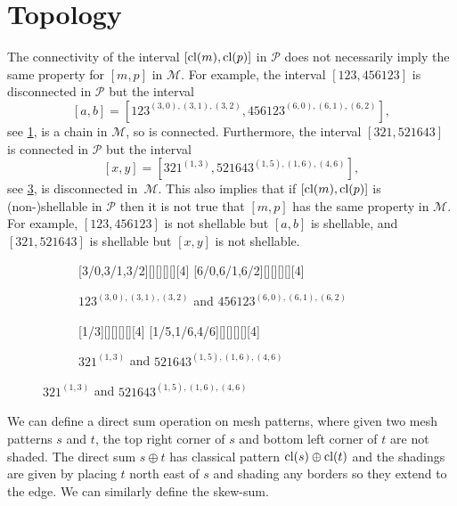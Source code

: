 \documentclass[11pt,a4paper,oneside]{article}
\begin{document}
\section{Topology}\label{sec:topology}
The connectivity of the interval $[\cl(m),\cl(p)]$ in $\mathcal{P}$ does
not necessarily imply the same property for $[m,p]$ in $\mathcal{M}$.
For example, the interval $[123,456123]$ is disconnected in $\mathcal{P}$ but the
interval $$[a,b]=[123^{(3,0),(3,1),(3,2)},456123^{(6,0),(6,1),(6,2)}],$$ see
\cref{fig:123}, is a chain in $\mathcal{M}$, so is connected. Furthermore, the interval
$[321,521643]$ is connected in $\mathcal{P}$ but the interval 
$$[x,y]=[321^{(1, 3)},521643^{(1, 5),(1, 6), (4, 6)}],$$ see \cref{fig:321}, is disconnected in~$\mathcal{M}$.
This also implies that if $[\cl(m),\cl(p)]$ is (non-)shellable in $\mathcal{P}$
then it is not true that $[m,p]$ has the same property in $\mathcal{M}$. For example,
$[123,456123]$ is not shellable but $[a,b]$ is shellable, and
$[321,521643]$ is shellable but $[x,y]$
is not shellable.

\begin{figure}[h]\centering
\begin{subfigure}{0.45\textwidth}\centering
{}[3/0,3/1,3/2][][][][][4]
[6/0,6/1,6/2][][][][][4]
\caption{$123^{(3,0),(3,1),(3,2)}$ and $456123^{(6,0),(6,1),(6,2)}$}\label{fig:123}
\end{subfigure}
\begin{subfigure}{0.45\textwidth}\centering
{}[1/3][][][][][4]
[1/5,1/6,4/6][][][][][4]
\caption{$321^{(1, 3)}$ and $521643^{(1, 5), (1, 6), (4, 6)}$}\label{fig:321}
\end{subfigure}
\end{figure}

We can define a direct sum operation on mesh patterns, where given two mesh
patterns $s$ and $t$, the top right corner of $s$ and bottom left corner
of $t$ are not shaded. The direct sum $s\oplus t$ has classical pattern
$\cl(s)\oplus\cl(t)$ and the shadings are given by placing $t$ north east of $s$
and shading any borders so they extend to the edge. We can similarly define the
skew-sum.

\begin{figure}
\begin{tikzpicture}

\end{tikzpicture}
\end{figure}
\end{document}
